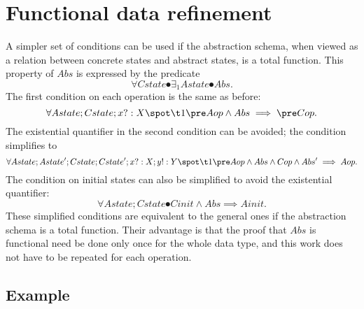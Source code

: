 \section{Functional data refinement}

A simpler set of conditions can be used if the abstraction schema,
when viewed as a relation between concrete states and abstract states,
is a total function. This property of $Abs$ is expressed by the predicate
\[ \forall Cstate \spot \exists_1 Astate \spot Abs. \]
The first condition on each operation is the same as before:
\[
	\forall Astate; Cstate; x?: X \spot \\
\t1		\pre Aop \land Abs \implies \pre Cop.
\]
The existential quantifier in the second condition can be avoided; the
condition simplifies to
\[
	\forall Astate; Astate'; Cstate; Cstate'; x?: X; y!: Y \spot \\
\t1		\pre Aop \land Abs \land Cop \land Abs' \implies Aop.
\] 
The condition on initial states can also be simplified to avoid the
existential quantifier:
\[ \forall Astate; Cstate \spot Cinit \land Abs \implies Ainit. \]
These simplified conditions are equivalent to the general ones if the
abstraction schema is a total function.  Their advantage is that the
proof that $Abs$ is functional need be done only once for the whole
data type, and this work does not have to be repeated for each
operation.

\subsection*{Example}

